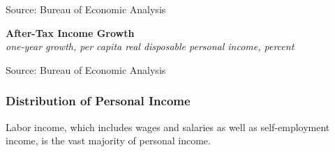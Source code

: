 \documentclass{report}
\makeatletter
\newcommand{\tbllink}[1]{\href{https://raw.githubusercontent.com/bdecon/US-chartbook/master/chartbook/data/#1}{\faTable}}
\newcommand*\short[1]{\expandafter\@gobbletwo\number\numexpr#1\relax}
\newcommand{\dateaxisticks}{
		date coordinates in=x, axis line style={draw=none},
		xmax={2024-01-31},
		max space between ticks=40,	    
		xtick={{1990-01-01}, {1992-01-01}, {1994-01-01}, 
			{1996-01-01}, {1998-01-01}, {2000-01-01}, 
			{2002-01-01}, {2004-01-01}, {2006-01-01},
			{2008-01-01}, {2010-01-01}, {2012-01-01}, {2014-01-01},
		    {2016-01-01}, {2018-01-01}, {2020-01-01}, {2022-01-01}, 
		    {2024-01-01}, {2026-01-01}},
		minor xtick={{1989-01-01}, {1991-01-01}, {1993-01-01},
			{1995-01-01}, {1997-01-01}, {1999-01-01}, 
			{2001-01-01}, {2003-01-01}, {2005-01-01}, {2007-01-01},
		    {2009-01-01}, {2011-01-01}, {2013-01-01}, {2015-01-01},
		    {2017-01-01}, {2019-01-01}, {2021-01-01}, {2023-01-01}, 
		    {2025-01-01}, {2027-01-01}},
		enlarge y limits={0.06}, enlarge x limits={0.01},
		xticklabel style={align=center, yshift=-2pt}, tick label style={inner sep=0pt},
		}
\newcommand{\bbar}[2]{extra #1 ticks = {{#2}}, extra #1 tick labels = ,
		extra #1 tick style = {grid=major, grid style={thick, black!25}},}
\newcommand{\stdline}[4]{\addplot[very thick, no markers, color=#1] 
		table [x=#2, y=#3, col sep=comma] {#4};	}
\newcommand{\rbars}{
		\fill[color=black!10] (axis cs:{1990-07-01},\pgfkeysvalueof{/pgfplots/ymin})
			rectangle (axis cs:{1991-03-01}, \pgfkeysvalueof{/pgfplots/ymax});
		\fill[color=black!10] (axis cs:{2007-12-01},\pgfkeysvalueof{/pgfplots/ymin})
			rectangle (axis cs:{2009-07-01}, \pgfkeysvalueof{/pgfplots/ymax});
		\fill[color=black!10] (axis cs:{2001-03-01},\pgfkeysvalueof{/pgfplots/ymin})
			rectangle (axis cs:{2001-11-01}, \pgfkeysvalueof{/pgfplots/ymax});
		\fill[color=black!10] (axis cs:{2020-02-01},\pgfkeysvalueof{/pgfplots/ymin})
			rectangle (axis cs:{2020-05-01}, \pgfkeysvalueof{/pgfplots/ymax});}
\makeatother
\begin{document}
{\begin{minipage}{0.89\textwidth}
\footnotesize{Source: Bureau of Economic Analysis}
\end{minipage}
\newpage
\vspace*{-9mm}

\begin{minipage}{1.0\textwidth}   
\small 
\vspace{2mm}

\normalsize \textbf{After-Tax Income Growth}\\
\footnotesize{\textit{one-year growth, per capita real disposable personal income, percent}}
\vspace{5.6cm}

\hspace{3mm} 

\footnotesize{Source: Bureau of Economic Analysis}  \hfill \tbllink{rdpigrowth.csv}
\vspace{2mm}

\subsubsection*{Distribution of Personal Income}
\small Labor income, which includes wages and salaries as well as self-employment income, is the vast majority of personal income. 
\vspace{2mm}


\end{minipage}}
\end{document}
